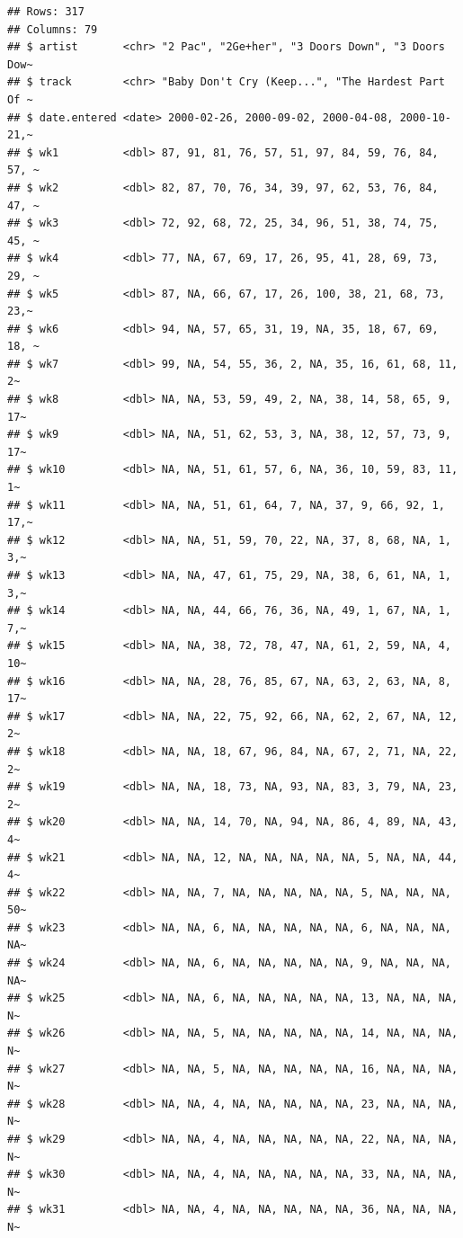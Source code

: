 \documentclass[
  11pt]{report}
\begin{document}
\begin{itemize}
\begin{verbatim}
## Rows: 317
## Columns: 79
## $ artist       <chr> "2 Pac", "2Ge+her", "3 Doors Down", "3 Doors Dow~
## $ track        <chr> "Baby Don't Cry (Keep...", "The Hardest Part Of ~
## $ date.entered <date> 2000-02-26, 2000-09-02, 2000-04-08, 2000-10-21,~
## $ wk1          <dbl> 87, 91, 81, 76, 57, 51, 97, 84, 59, 76, 84, 57, ~
## $ wk2          <dbl> 82, 87, 70, 76, 34, 39, 97, 62, 53, 76, 84, 47, ~
## $ wk3          <dbl> 72, 92, 68, 72, 25, 34, 96, 51, 38, 74, 75, 45, ~
## $ wk4          <dbl> 77, NA, 67, 69, 17, 26, 95, 41, 28, 69, 73, 29, ~
## $ wk5          <dbl> 87, NA, 66, 67, 17, 26, 100, 38, 21, 68, 73, 23,~
## $ wk6          <dbl> 94, NA, 57, 65, 31, 19, NA, 35, 18, 67, 69, 18, ~
## $ wk7          <dbl> 99, NA, 54, 55, 36, 2, NA, 35, 16, 61, 68, 11, 2~
## $ wk8          <dbl> NA, NA, 53, 59, 49, 2, NA, 38, 14, 58, 65, 9, 17~
## $ wk9          <dbl> NA, NA, 51, 62, 53, 3, NA, 38, 12, 57, 73, 9, 17~
## $ wk10         <dbl> NA, NA, 51, 61, 57, 6, NA, 36, 10, 59, 83, 11, 1~
## $ wk11         <dbl> NA, NA, 51, 61, 64, 7, NA, 37, 9, 66, 92, 1, 17,~
## $ wk12         <dbl> NA, NA, 51, 59, 70, 22, NA, 37, 8, 68, NA, 1, 3,~
## $ wk13         <dbl> NA, NA, 47, 61, 75, 29, NA, 38, 6, 61, NA, 1, 3,~
## $ wk14         <dbl> NA, NA, 44, 66, 76, 36, NA, 49, 1, 67, NA, 1, 7,~
## $ wk15         <dbl> NA, NA, 38, 72, 78, 47, NA, 61, 2, 59, NA, 4, 10~
## $ wk16         <dbl> NA, NA, 28, 76, 85, 67, NA, 63, 2, 63, NA, 8, 17~
## $ wk17         <dbl> NA, NA, 22, 75, 92, 66, NA, 62, 2, 67, NA, 12, 2~
## $ wk18         <dbl> NA, NA, 18, 67, 96, 84, NA, 67, 2, 71, NA, 22, 2~
## $ wk19         <dbl> NA, NA, 18, 73, NA, 93, NA, 83, 3, 79, NA, 23, 2~
## $ wk20         <dbl> NA, NA, 14, 70, NA, 94, NA, 86, 4, 89, NA, 43, 4~
## $ wk21         <dbl> NA, NA, 12, NA, NA, NA, NA, NA, 5, NA, NA, 44, 4~
## $ wk22         <dbl> NA, NA, 7, NA, NA, NA, NA, NA, 5, NA, NA, NA, 50~
## $ wk23         <dbl> NA, NA, 6, NA, NA, NA, NA, NA, 6, NA, NA, NA, NA~
## $ wk24         <dbl> NA, NA, 6, NA, NA, NA, NA, NA, 9, NA, NA, NA, NA~
## $ wk25         <dbl> NA, NA, 6, NA, NA, NA, NA, NA, 13, NA, NA, NA, N~
## $ wk26         <dbl> NA, NA, 5, NA, NA, NA, NA, NA, 14, NA, NA, NA, N~
## $ wk27         <dbl> NA, NA, 5, NA, NA, NA, NA, NA, 16, NA, NA, NA, N~
## $ wk28         <dbl> NA, NA, 4, NA, NA, NA, NA, NA, 23, NA, NA, NA, N~
## $ wk29         <dbl> NA, NA, 4, NA, NA, NA, NA, NA, 22, NA, NA, NA, N~
## $ wk30         <dbl> NA, NA, 4, NA, NA, NA, NA, NA, 33, NA, NA, NA, N~
## $ wk31         <dbl> NA, NA, 4, NA, NA, NA, NA, NA, 36, NA, NA, NA, N~

\end{verbatim}
\end{itemize}
\end{document}
